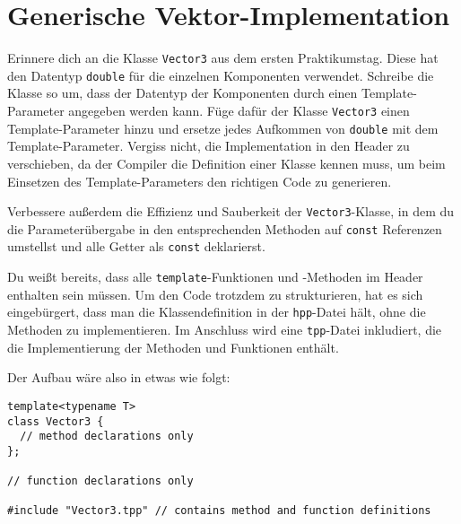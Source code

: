 \section{Generische Vektor-Implementation}
Erinnere dich an die Klasse \texttt{Vector3} aus dem ersten Praktikumstag. Diese hat den Datentyp \texttt{double} für die einzelnen Komponenten verwendet. Schreibe die Klasse so um, dass der Datentyp der Komponenten durch einen Template-Parameter angegeben werden kann.
Füge dafür der Klasse \texttt{Vector3} einen Template-Parameter hinzu und ersetze jedes Aufkommen von \texttt{double} mit dem Template-Parameter.
Vergiss nicht, die Implementation in den Header zu verschieben, da der Compiler die Definition einer Klasse kennen muss, um beim Einsetzen des Template-Parameters den richtigen Code zu generieren.

Verbessere außerdem die Effizienz und Sauberkeit der \texttt{Vector3}-Klasse, in dem du die Parameterübergabe in den entsprechenden Methoden auf \texttt{const} Referenzen umstellst und alle Getter als \texttt{const} deklarierst.

Du weißt bereits, dass alle \texttt{template}-Funktionen und -Methoden im Header enthalten sein müssen.
Um den Code trotzdem zu strukturieren, hat es sich eingebürgert, dass man die Klassendefinition in der \texttt{hpp}-Datei hält, ohne die Methoden zu implementieren.
Im Anschluss wird eine \texttt{tpp}-Datei inkludiert, die die Implementierung der Methoden und Funktionen enthält.
    
Der Aufbau wäre also in etwas wie folgt:
\begin{lstlisting}
template<typename T>
class Vector3 {
  // method declarations only
};

// function declarations only

#include "Vector3.tpp" // contains method and function definitions
\end{lstlisting}
